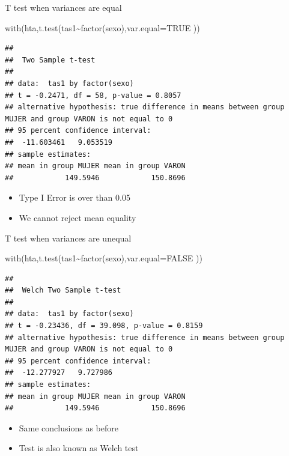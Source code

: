\documentclass[
  ignorenonframetext,
]{beamer}
\newenvironment{Shaded}{\begin{snugshade}}{\end{snugshade}}
\newcommand{\AttributeTok}[1]{\textcolor[rgb]{0.77,0.63,0.00}{#1}}
\newcommand{\ConstantTok}[1]{\textcolor[rgb]{0.00,0.00,0.00}{#1}}
\newcommand{\FunctionTok}[1]{\textcolor[rgb]{0.00,0.00,0.00}{#1}}
\newcommand{\NormalTok}[1]{#1}
\newcommand{\SpecialCharTok}[1]{\textcolor[rgb]{0.00,0.00,0.00}{#1}}
\providecommand{\tightlist}{%
  \setlength{\itemsep}{0pt}\setlength{\parskip}{0pt}}
\begin{document}
\begin{frame}[fragile]{T test when variances are equal}
\protect\hypertarget{t-test-when-variances-are-equal}{}
\small

\begin{Shaded}
\begin{Highlighting}[]
\FunctionTok{with}\NormalTok{(hta,}\FunctionTok{t.test}\NormalTok{(tas1}\SpecialCharTok{\textasciitilde{}}\FunctionTok{factor}\NormalTok{(sexo),}\AttributeTok{var.equal=}\ConstantTok{TRUE}\NormalTok{ ))}
\end{Highlighting}
\end{Shaded}

\begin{verbatim}
## 
##  Two Sample t-test
## 
## data:  tas1 by factor(sexo)
## t = -0.2471, df = 58, p-value = 0.8057
## alternative hypothesis: true difference in means between group MUJER and group VARON is not equal to 0
## 95 percent confidence interval:
##  -11.603461   9.053519
## sample estimates:
## mean in group MUJER mean in group VARON 
##            149.5946            150.8696
\end{verbatim}

\begin{itemize}
\tightlist
\item
  Type I Error is over than 0.05
\item
  We cannot reject mean equality
\end{itemize}
\end{frame}

\begin{frame}[fragile]{T test when variances are unequal}
\protect\hypertarget{t-test-when-variances-are-unequal}{}
\small

\begin{Shaded}
\begin{Highlighting}[]
\FunctionTok{with}\NormalTok{(hta,}\FunctionTok{t.test}\NormalTok{(tas1}\SpecialCharTok{\textasciitilde{}}\FunctionTok{factor}\NormalTok{(sexo),}\AttributeTok{var.equal=}\ConstantTok{FALSE}\NormalTok{ ))}
\end{Highlighting}
\end{Shaded}

\begin{verbatim}
## 
##  Welch Two Sample t-test
## 
## data:  tas1 by factor(sexo)
## t = -0.23436, df = 39.098, p-value = 0.8159
## alternative hypothesis: true difference in means between group MUJER and group VARON is not equal to 0
## 95 percent confidence interval:
##  -12.277927   9.727986
## sample estimates:
## mean in group MUJER mean in group VARON 
##            149.5946            150.8696
\end{verbatim}

\begin{itemize}
\tightlist
\item
  Same conclusions as before
\item
  Test is also known as Welch test
\end{itemize}
\end{frame}
\end{document}
